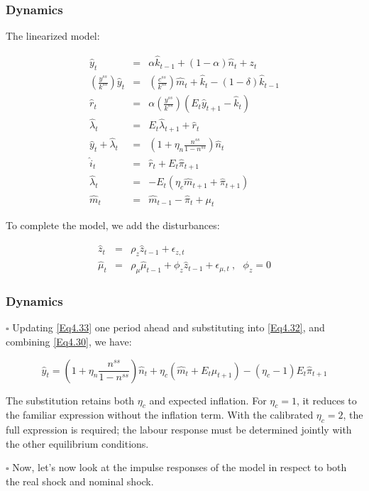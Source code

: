 \documentclass[handout]{beamer}
\begin{document}
\begin{frame}
\frametitle{Dynamics}\vskip 0.1in

The linearized model:\\

{\scriptsize{
\begin{eqnarray}
\hat{y}_{t} &=& \alpha \hat{k}_{t-1}+(1-\alpha)\hat{n}_{t}+z_{t}\label{Eq4.26}\\
(\frac{y^{ss}}{k^{ss}})\hat{y}_{t} &=&
(\frac{c^{ss}}{k^{ss}})\hat{m}_{t} +
\hat{k}_{t} -(1-\delta)\hat{k}_{t-1}\label{Eq4.27}\\
\hat{r}_{t} &=& \alpha (\frac{y^{ss}}{k^{ss}})
(E_{t}\hat{y}_{t+1}-\hat{k}_{t})\label{Eq4.28}\\
\hat{\lambda}_{t} &=& E_{t} \hat{\lambda}_{t+1} + \hat{r}_{t}\label{Eq4.29}\\
\hat{y}_{t} + \hat{\lambda}_{t} &=&
(1+\eta_{n}\frac{n^{ss}}{1-n^{ss}})\hat{n}_{t}\label{Eq4.30}\\
\hat{i}_{t} &=& \hat{r}_{t} + E_{t}\hat{\pi}_{t+1}\label{Eq4.31}\\
\hat{\lambda}_{t} &=& -E_{t} (\eta_{c} \hat{m}_{t+1} +
\hat{\pi}_{t+1})\label{Eq4.32}\\
\hat{m}_{t} &=& \hat{m}_{t-1} - \hat{\pi}_{t} +
\mu_{t}\label{Eq4.33}
\end{eqnarray}

To complete the model, we add the disturbances:

\begin{eqnarray}
\hat{z}_{t} &=& \rho_{z} \hat{z}_{t-1}+\epsilon_{z,t} \label{Eq4.34}\\
\hat{\mu}_{t} &=& \rho_{\mu}\hat{\mu}_{t-1}+\phi_z
\hat{z}_{t-1}+\epsilon_{\mu,t} ~ , ~~~ \phi_z = 0 \label{Eq4.35}
\end{eqnarray}
}}

\end{frame}



\begin{frame}
\frametitle{Dynamics}\vskip 0.1in

$\square$ Updating \eqref{Eq4.33} one period ahead and substituting
into \eqref{Eq4.32}, and combining \eqref{Eq4.30}, we have:

\begin{equation}\label{Eq4.36}
\hat{y}_{t} = (1+\eta_{n}\frac{n^{ss}}{1-n^{ss}})\hat{n}_{t} +
\eta_c(\hat{m}_{t}+E_{t}\mu_{t+1})
-(\eta_c-1)E_t\hat{\pi}_{t+1}
\end{equation}

The substitution retains both $\eta_c$ and expected inflation. For $\eta_c=1$, it reduces to the familiar expression without the inflation term. With the calibrated $\eta_c=2$, the full expression is required; the labour response must be determined jointly with the other equilibrium conditions.\\\vskip 0.1in

\pause

$\square$ Now, let's now look at the impulse responses of the model
in respect to both the real shock and nominal shock.


\end{frame}
\end{document}

